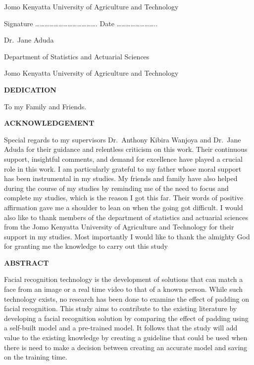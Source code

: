 \documentclass[
  12pt,
]{article}
\begin{document}
Jomo Kenyatta University of Agriculture and Technology

Signature
\ldots\ldots\ldots\ldots\ldots\ldots\ldots\ldots\ldots\ldots\ldots\ldots\ldots.
Date \ldots\ldots\ldots\ldots\ldots\ldots\ldots\ldots..

Dr.~Jane Aduda

Department of Statistics and Actuarial Sciences

Jomo Kenyatta University of Agriculture and Technology

\newpage

\begin{centering}

{\bf DEDICATION}

\end{centering}
\large

To my Family and Friends.

\newpage

\begin{centering}

{\bf ACKNOWLEDGEMENT}

\end{centering}
\large

Special regards to my supervisors Dr.~Anthony Kibira Wanjoya and
Dr.~Jane Aduda for their guidance and relentless criticism on this work.
Their continuous support, insightful comments, and demand for excellence
have played a crucial role in this work. I am particularly grateful to
my father whose moral support has been instrumental in my studies. My
friends and family have also helped during the course of my studies by
reminding me of the need to focus and complete my studies, which is the
reason I got this far. Their words of positive affirmation gave me a
shoulder to lean on when the going got difficult. I would also like to
thank members of the department of statistics and actuarial sciences
from the Jomo Kenyatta University of Agriculture and Technology for
their support in my studies. Most importantly I would like to thank the
almighty God for granting me the knowledge to carry out this study

\newpage

\begin{centering}

{\bf ABSTRACT}

\end{centering}

\doublespacing
\large

Facial recognition technology is the development of solutions that can
match a face from an image or a real time video to that of a known
person. While such technology exists, no research has been done to
examine the effect of padding on facial recognition. This study aims to
contribute to the existing literature by developing a facial recognition
solution by comparing the effect of padding using a self-built model and
a pre-trained model. It follows that the study will add value to the
existing knowledge by creating a guideline that could be used when there
is need to make a decision between creating an accurate model and saving
on the training time.
\end{document}
